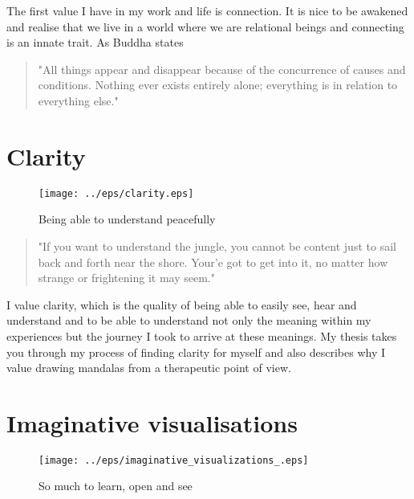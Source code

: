 
The first value I have in my work and life is connection. It is nice to be awakened and realise that we live in a world where we are relational beings and connecting is an innate trait. As Buddha states 
\begin{quote} "All things appear and disappear because of the concurrence of causes and conditions. Nothing ever exists entirely alone; everything is in relation to everything else." 
\end{quote}

\newpage
\section{Clarity} 

\begin{figure}[!h]
\begin{center}
\texttt{[image: ../eps/clarity.eps]} 
\caption{Being able to understand peacefully}
\label{Clarity}
\end{center}
\end{figure}


\begin{quote}
"If you want to understand the jungle, you cannot be content just to sail back and forth near the shore. Your'e got to get into it, no matter how strange or frightening it may seem."
\end{quote}

I value clarity, which is the quality of being able to easily see, hear and understand and to be able to understand not only the meaning within my experiences but the journey I took to arrive at these meanings. My thesis takes you through my process of finding clarity for myself and also describes why I value drawing mandalas from a therapeutic point of view. 

\newpage
\section {Imaginative visualisations}

\begin{figure}[!h]
\begin{center}
\texttt{[image: ../eps/imaginative\_visualizations\_.eps]} 
\caption{ So much to learn, open and see}
\label{Imaginative visualisations}
\end{center}
\end{figure}


